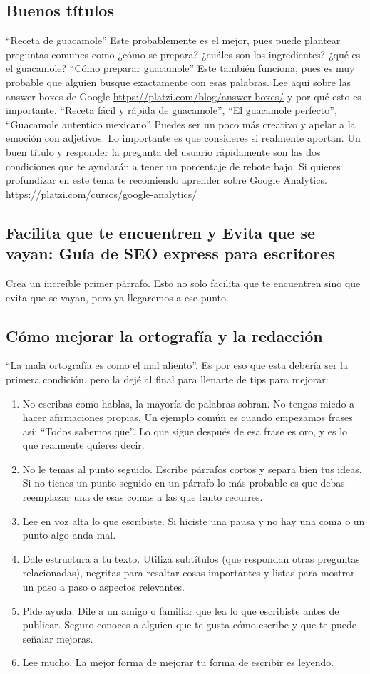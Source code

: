 \documentclass{article}
\begin{document}
    \subsection{Buenos títulos}
    “Receta de guacamole”
    Este probablemente es el mejor, pues puede plantear preguntas comunes como ¿cómo se prepara? ¿cuáles son los ingredientes? ¿qué es el guacamole?
    “Cómo preparar guacamole”
    Este también funciona, pues es muy probable que alguien busque exactamente con esas palabras. Lee aquí sobre las answer boxes de Google \url{https://platzi.com/blog/answer-boxes/} y por qué esto es importante.
    “Receta fácil y rápida de guacamole”, “El guacamole perfecto”, “Guacamole autentico mexicano”
    Puedes ser un poco más creativo y apelar a la emoción con adjetivos. Lo importante es que consideres si realmente aportan.
    Un buen título y responder la pregunta del usuario rápidamente son las dos condiciones que te ayudarán a tener un porcentaje de rebote bajo. Si quieres profundizar en este tema te recomiendo aprender sobre Google Analytics.
    \url{https://platzi.com/cursos/google-analytics/}
    \subsection{Facilita que te encuentren y Evita que se vayan: Guía de SEO express para escritores}
    Crea un increíble primer párrafo. Esto no solo facilita que te encuentren sino que evita que se vayan, pero ya llegaremos a ese punto.
    \subsection{Cómo mejorar la ortografía y la redacción}
    “La mala ortografía es como el mal aliento”. Es por eso que esta debería ser la primera condición, pero la dejé al final para llenarte de tips para mejorar:
    \begin{enumerate}
        \item No escribas como hablas, la mayoría de palabras sobran. No tengas miedo a hacer afirmaciones propias. Un ejemplo común es cuando empezamos frases así: “Todos sabemos que”. Lo que sigue después de esa frase es oro, y es lo que realmente quieres decir.
        \item No le temas al punto seguido. Escribe párrafos cortos y separa bien tus ideas. Si no tienes un punto seguido en un párrafo lo más probable es que debas reemplazar una de esas comas a las que tanto recurres.
        \item Lee en voz alta lo que escribiste. Si hiciste una pausa y no hay una coma o un punto algo anda mal.
        \item Dale estructura a tu texto. Utiliza subtítulos (que respondan otras preguntas relacionadas), negritas para resaltar cosas importantes y listas para mostrar un paso a paso o aspectos relevantes.
        \item Pide ayuda. Dile a un amigo o familiar que lea lo que escribiste antes de publicar. Seguro conoces a alguien que te gusta cómo escribe y que te puede señalar mejoras.
        \item Lee mucho. La mejor forma de mejorar tu forma de escribir es leyendo.
    \end{enumerate}
\end{document}
